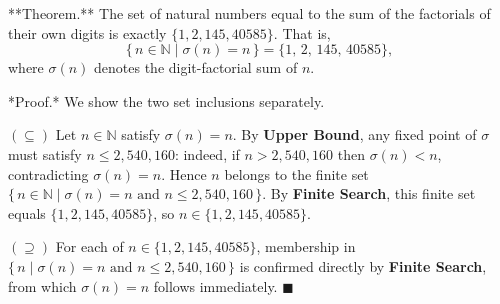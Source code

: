 **Theorem.** The set of natural numbers equal to the sum of the factorials of their own digits is exactly $\{1, 2, 145, 40585\}$. That is,
$$\{\, n \in \mathbb{N} \mid \sigma(n) = n \,\} = \{1,\, 2,\, 145,\, 40585\},$$
where $\sigma(n)$ denotes the digit-factorial sum of $n$.

*Proof.* We show the two set inclusions separately.

$(\subseteq)$ Let $n \in \mathbb{N}$ satisfy $\sigma(n) = n$. By \textbf{Upper Bound}, any fixed point of $\sigma$ must satisfy $n \leq 2{,}540{,}160$: indeed, if $n > 2{,}540{,}160$ then $\sigma(n) < n$, contradicting $\sigma(n) = n$. Hence $n$ belongs to the finite set $\{\, n \in \mathbb{N} \mid \sigma(n) = n \text{ and } n \leq 2{,}540{,}160\,\}$. By \textbf{Finite Search}, this finite set equals $\{1, 2, 145, 40585\}$, so $n \in \{1, 2, 145, 40585\}$.

$(\supseteq)$ For each of $n \in \{1, 2, 145, 40585\}$, membership in $\{\, n \mid \sigma(n) = n \text{ and } n \leq 2{,}540{,}160\,\}$ is confirmed directly by \textbf{Finite Search}, from which $\sigma(n) = n$ follows immediately. $\blacksquare$